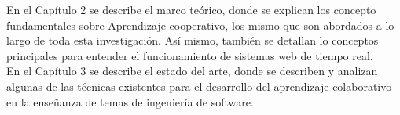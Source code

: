 En el Capítulo 2 se describe el marco teórico, donde se explican los concepto fundamentales sobre Aprendizaje cooperativo, los mismo que son abordados a lo largo de toda esta investigación. Así mismo, también se detallan lo conceptos principales para entender el funcionamiento de sistemas web de tiempo real.\\

En el Capítulo 3 se describe el estado del arte, donde se describen y analizan algunas de las técnicas existentes para el desarrollo del aprendizaje colaborativo en la enseñanza de temas de ingeniería de software.

